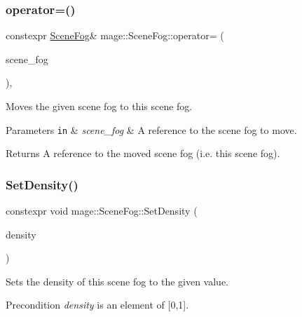 \subsubsection{\texorpdfstring{operator=()}{operator=()}\hspace{0.1cm}{\footnotesize\ttfamily [2/2]}}
{\footnotesize\ttfamily constexpr \hyperlink{classmage_1_1_scene_fog}{Scene\+Fog}\& mage\+::\+Scene\+Fog\+::operator= (\begin{DoxyParamCaption}\item[{\hyperlink{classmage_1_1_scene_fog}{Scene\+Fog} \&\&}]{scene\+\_\+fog }\end{DoxyParamCaption})\hspace{0.3cm}{\ttfamily [default]}, {\ttfamily [noexcept]}}

Moves the given scene fog to this scene fog.


\begin{DoxyParams}[1]{Parameters}
\mbox{\tt in}  & {\em scene\+\_\+fog} & A reference to the scene fog to move. \\
\hline
\end{DoxyParams}
\begin{DoxyReturn}{Returns}
A reference to the moved scene fog (i.\+e. this scene fog). 
\end{DoxyReturn}
\hypertarget{classmage_1_1_scene_fog_a45af4587ff29f16883545b3be7b0ab06}{}\label{classmage_1_1_scene_fog_a45af4587ff29f16883545b3be7b0ab06} 
\subsubsection{\texorpdfstring{Set\+Density()}{SetDensity()}}
{\footnotesize\ttfamily constexpr void mage\+::\+Scene\+Fog\+::\+Set\+Density (\begin{DoxyParamCaption}\item[{\hyperlink{namespacemage_aa97e833b45f06d60a0a9c4fc22ae02c0}{F32}}]{density }\end{DoxyParamCaption})\hspace{0.3cm}{\ttfamily [noexcept]}}

Sets the density of this scene fog to the given value.

\begin{DoxyPrecond}{Precondition}
{\itshape density} is an element of \mbox{[}0,1\mbox{]}. 
\end{DoxyPrecond}

